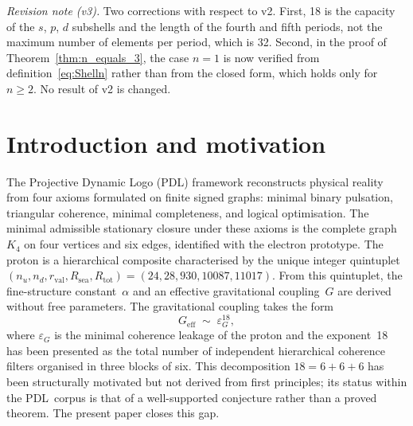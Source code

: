 \documentclass[11pt,a4paper]{article}
\theoremstyle{definition}
\newcommand{\PDL}{\textnormal{PDL}}
\newcommand{\Rsea}{R_{\mathrm{sea}}}
\newcommand{\Rtot}{R_{\mathrm{tot}}}
\newcommand{\rval}{r_{\mathrm{val}}}
\newcommand{\epsg}{\varepsilon_G}
\newcommand{\Kfour}{K_4}
\newcommand{\Sfour}{\partial\Delta^3}
\newcommand{\Efun}{E}
\newcommand{\Shell}{\mathrm{Shell}}
\begin{document}
\begin{abstract}
irreducible representations of $\mathrm{SO}(3)$ to fill atomic shells in groups of~18 and the simplicial boundary $\Sfour = S^2$ to impose a rank deficit of~1 at each hierarchical \PDL\ transition. Going further, we establish exact closed-form expressions $\Efun(n) = n(n^2+3)/2$ for the \PDL\ gravitational exponent and $\Shell(n) = 3\binom{2n-2}{n-1}$ for the maximum shell occupancy in a $\mathbb{R}^n$-based framework, and prove that $\Efun(n) = \Shell(n)$ if and only if $n \in \{1,\,3\}$: our universe is the unique non-trivial dimension in which the gravitational coupling structure and the atomic shell structure are governed by the same topological integer. All calculations are performed without free parameters over $\mathbb{Q}(\sqrt{5})$ using exact symbolic arithmetic.
\end{abstract}
\noindent\textit{Revision note (v3).} Two corrections with respect to v2. First, 18 is the capacity of the $s$, $p$, $d$ subshells and the length of the fourth and fifth periods, not the maximum number of elements per period, which is 32. Second, in the proof of Theorem~\ref{thm:n_equals_3}, the case $n = 1$ is now verified from definition~\eqref{eq:Shelln} rather than from the closed form, which holds only for $n \geq 2$. No result of v2 is changed.

\section{Introduction and motivation}
\label{sec:intro}
The Projective Dynamic Logo (\PDL) framework reconstructs physical reality from four axioms formulated on finite signed graphs: minimal binary pulsation, triangular coherence, minimal completeness, and logical optimisation.\cite{PDL_Main_2026,PDL_Intro_2026} The minimal admissible stationary closure under these axioms is the complete graph $\Kfour$ on four vertices and six edges, identified with the electron prototype.\cite{PDL_Main_2026} The proton is a hierarchical composite characterised by the unique integer quintuplet $(n_u, n_d, \rval, \Rsea, \Rtot) = (24, 28, 930, 10087, 11017)$.\cite{Combinatorial_Proton_v2_2026} From this quintuplet, the fine-structure constant~$\alpha$ and an effective gravitational coupling~$G$ are derived without free parameters.\cite{Alpha_PDL_v2_2026,Bridge_Formula_PDL_2026} The gravitational coupling takes the form
\begin{equation}
  \label{eq:G_eps18}
  G_{\mathrm{eff}} \;\sim\; \epsg^{18},
\end{equation}
where $\epsg$ is the minimal coherence leakage of the proton and the exponent~18 has been presented as the total number of independent hierarchical coherence filters organised in three blocks of six.\cite{Exponent_18_PDL_2026} This decomposition $18 = 6 + 6 + 6$ has been structurally motivated but not derived from first principles; its status within the \PDL\ corpus is that of a well-supported conjecture rather than a proved theorem.\cite{Exponent_18_PDL_2026,PDL_Global_Mapping_2026} The present paper closes this gap.
\end{document}
